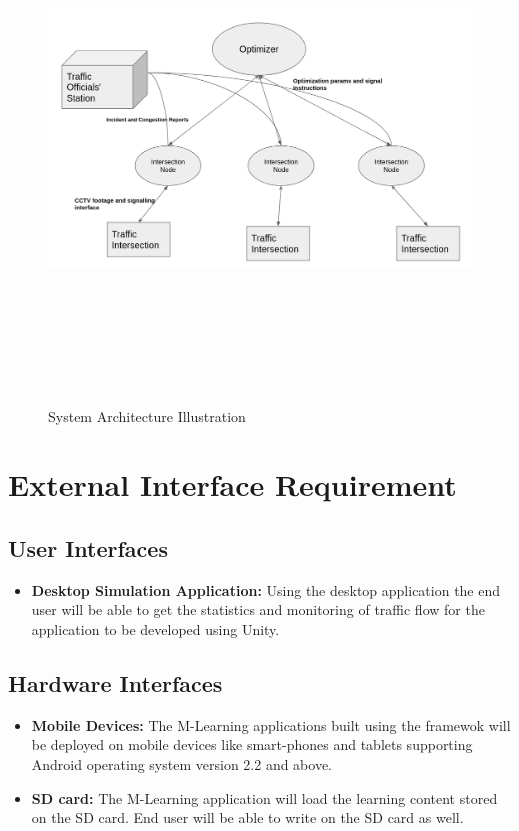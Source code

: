 \documentclass[openany,12pt]{report}
\begin{document}
\begin{figure}[H]
	\centering
	\includegraphics[width=6.5in,height=5.5in]{./diagrams/png/architecture}
	\caption{System Architecture Illustration}
\end{figure}

\section{External Interface Requirement}

\subsection{User Interfaces}

\begin{itemize}
\item{\textbf{Desktop Simulation Application:}  Using the desktop application the end user will be able to get the statistics and monitoring of traffic flow for the application to be developed using Unity.}
\end{itemize}

\subsection{Hardware Interfaces}
\begin{itemize}
\item{\textbf{Mobile Devices:} The M-Learning applications built using the framewok will be deployed on mobile devices like smart-phones and tablets supporting Android operating system version 2.2 and above.}
\item{\textbf{SD card:}  The M-Learning application will load the learning content stored on the SD card. End user will be able to write on the SD card as well.}
\end{itemize}
\end{document}
